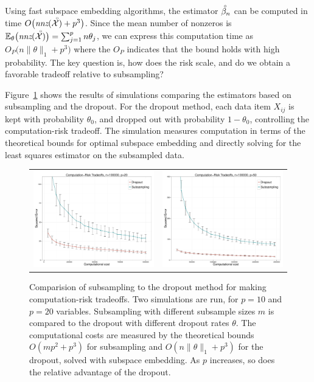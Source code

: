 Using fast subspace embedding algorithms, the estimator
$\accentset{\;\circ}{\beta}_n$ can be computed in time
$O\bigl(\textit{nnz}(\accentset{\;\circ}{\mathcal{X}}) +p^3\bigr)$.
Since the mean number of nonzeros is ${\mathbb E}_\theta\bigl( \text{\it nnz}(\accentset{\;\circ}{\mathcal{X}})\bigr) =
\sum_{j=1}^p n\theta_j$, we can express this
computation time as $O_P\bigl( n\|\theta\|_1 + p^3\bigr)$
where the $O_P$ indicates that the bound holds with high probability.
The key question is, how does the risk scale, and do we obtain
a favorable tradeoff relative to subsampling?

Figure~\ref{fig:doss} shows the results of simulations comparing the
estimators based on subsampling and the dropout.  For the dropout
method, each data item $X_{ij}$ is kept with probability $\theta_0$,
and dropped out with probability $1-\theta_0$, controlling the 
computation-risk tradeoff.  The simulation measures
computation in terms of the theoretical bounds
for optimal subspace embedding and directly solving for the least squares
estimator on the subsampled data.

\begin{figure}
\begin{center}
\begin{tabular}{cc}
\includegraphics[width=.48\textwidth]{figs/dropout-subsample-n100000-p20-T100.pdf} &
\hskip-10pt
\includegraphics[width=.48\textwidth]{figs/dropout-subsample-n100000-p50-T100.pdf}
\end{tabular}
\end{center}
\caption{Comparision of subsampling to the dropout method for making
  computation-risk tradeoffs.  Two simulations are run, for $p=10$ and
  $p=20$ variables.  Subsampling with different subsample sizes $m$ is
  compared to the dropout with different dropout rates $\theta$.  The
  computational costs are measured by the theoretical bounds $O(mp^2 +
  p^3)$ for subsampling and $O(n\|\theta\|_1 + p^3)$ for the dropout,
  solved with subspace embedding. As $p$ increases, so does the
  relative advantage of the dropout.}
\label{fig:doss}
\end{figure}





